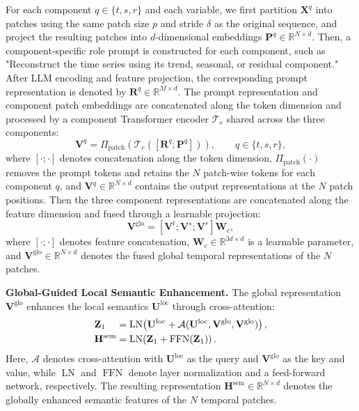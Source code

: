 \documentclass[letterpaper]{article} %
\begin{document}
For each component $q\in\{t,s,r\}$ and each variable, we first partition $\mathbf{X}^{q}$ into patches using the same patch size $p$ and stride $\delta$ as the original sequence, and project the resulting patches into $d$-dimensional embeddings $\mathbf{P}^{q}\in\mathbb{R}^{N\times d}$. Then, a component-specific role prompt is constructed for each component, such as "Reconstruct the time series using its trend, seasonal, or residual component." After LLM encoding and feature projection, the
corresponding prompt representation is denoted by
$\mathbf{R}^{q}\in\mathbb{R}^{M\times d}$. The prompt representation and component patch embeddings are
concatenated along the token dimension and processed by a component Transformer encoder $\mathcal{T}_e$ shared across the three components:
\begin{equation}
    \mathbf{V}^{q}
    =
    \Pi_{\mathrm{patch}}
    \left(
    \mathcal{T}_e
    \left(
    [\mathbf{R}^{q}; \mathbf{P}^{q}]
    \right)
    \right),
    \qquad
    q\in\{t,s,r\},
\end{equation}
where $[\cdot;\cdot]$ denotes concatenation along the token dimension, $\Pi_{\mathrm{patch}}\left(\cdot\right)$ removes the prompt tokens and retains the $N$ patch-wise tokens for each component $q$, and $\mathbf{V}^{q}\in\mathbb{R}^{N \times d}$ contains the output representations at the $N$ patch positions. Then the three component representations are concatenated along the feature
dimension and fused through a learnable projection:
\begin{equation}
    \mathbf{V}^{\mathrm{glo}}
    =
    \left[
    \mathbf{V}^{t}
    ;
    \mathbf{V}^{s}
    ;
    \mathbf{V}^{r}
    \right]
    \mathbf{W}_{c},
\end{equation}
where $[\cdot;\cdot]$ denotes feature concatenation,
$\mathbf{W}_{c}\in\mathbb{R}^{3d\times d}$ is a learnable parameter, and
$\mathbf{V}^{\mathrm{glo}}\in\mathbb{R}^{N\times d}$ denotes
the fused global temporal representations of the $N$ patches.

\noindent\textbf{Global-Guided Local Semantic Enhancement.} The global representation $\mathbf{V}^{\mathrm{glo}}$ enhances the local semantics
$\mathbf{U}^{\mathrm{loc}}$ through cross-attention:
\begin{align}
    \makebox[0pt][l]{\ensuremath{\mathbf{Z}_1}}
    \phantom{\mathbf{H}^{\mathrm{sem}}}
    &=
    \operatorname{LN}\!\left(
    \mathbf{U}^{\mathrm{loc}}
    +\mathcal{A}(\mathbf{U}^{\mathrm{loc}},\mathbf{V}^{\mathrm{glo}},\mathbf{V}^{\mathrm{glo}})
    \right),\\
    \mathbf{H}^{\mathrm{sem}}
    &=
    \operatorname{LN}\!\left(
    \mathbf{Z}_1+\operatorname{FFN}(\mathbf{Z}_1)
    \right).
\end{align}
Here, $\mathcal{A}$ denotes cross-attention with
$\mathbf{U}^{\mathrm{loc}}$ as the query and $\mathbf{V}^{\mathrm{glo}}$ as the key and
value, while $\operatorname{LN}$ and $\operatorname{FFN}$ denote layer
normalization and a feed-forward network, respectively. The resulting representation
$\mathbf{H}^{\mathrm{sem}}\in\mathbb{R}^{N\times d}$
denotes the globally enhanced semantic features of the $N$ temporal patches.
\end{document}
